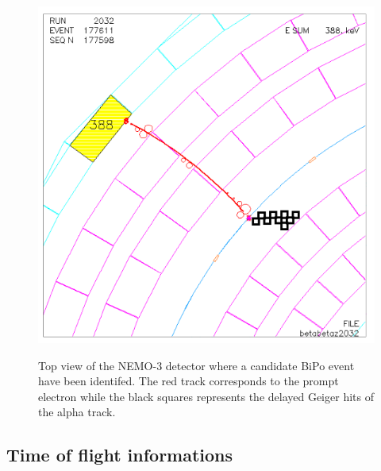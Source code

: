 \documentclass[main.tex]{subfiles}
\begin{document}
\begin{figure}[h!]
\centering
\includegraphics[scale=0.4]{pictures/Chap6/alphaIdentification.png}
\label{AlphaNEMO3}
\caption{Top view of the NEMO-3 detector where a candidate BiPo event have been identifed. The red track corresponds to the prompt electron while the black squares represents the delayed Geiger hits of the alpha track.}
\end{figure}


\FloatBarrier

\subsection{Time of flight informations}\label{sec:TOFanalysis}
\end{document}
